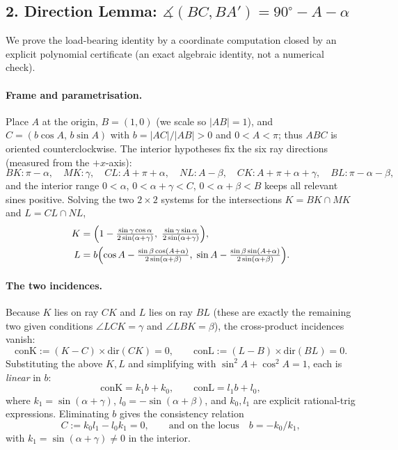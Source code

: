 \documentclass[11pt]{article}
\newcommand{\dangle}{\measuredangle}
\theoremstyle{plain}\newtheorem{lemma}{Lemma}
\theoremstyle{remark}\newtheorem*{rmk}{Remark}
\begin{document}
\subsection*{2. Direction Lemma: $\dangle(BC,BA')=90^{\circ}-A-\alpha$}

We prove the load-bearing identity by a coordinate computation closed by an
explicit polynomial certificate (an exact algebraic identity, not a numerical
check).

\paragraph{Frame and parametrisation.}
Place $A$ at the origin, $B=(1,0)$ (we scale so $|AB|=1$), and
$C=(b\cos A,\,b\sin A)$ with $b=|AC|/|AB|>0$ and $0<A<\pi$; thus $ABC$ is
oriented counterclockwise. The interior hypotheses fix the six ray directions
(measured from the $+x$-axis):
\[
  BK:\pi-\alpha,\quad MK:\gamma,\quad CL:A+\pi+\alpha,\quad
  NL:A-\beta,\quad CK:A+\pi+\alpha+\gamma,\quad BL:\pi-\alpha-\beta,
\]
and the interior range $0<\alpha$, $0<\alpha+\gamma<C$, $0<\alpha+\beta<B$ keeps
all relevant sines positive. Solving the two $2\times2$ systems for the
intersections $K=BK\cap MK$ and $L=CL\cap NL$,
\begin{align*}
  K&=\Bigl(1-\tfrac{\sin\gamma\cos\alpha}{2\sin(\alpha+\gamma)},\;
          \tfrac{\sin\gamma\sin\alpha}{2\sin(\alpha+\gamma)}\Bigr),\\
  L&=b\Bigl(\cos A-\tfrac{\sin\beta\cos(A+\alpha)}{2\sin(\alpha+\beta)},\;
          \sin A-\tfrac{\sin\beta\sin(A+\alpha)}{2\sin(\alpha+\beta)}\Bigr).
\end{align*}

\paragraph{The two incidences.}
Because $K$ lies on ray $CK$ and $L$ lies on ray $BL$ (these are exactly the
remaining two given conditions $\angle LCK=\gamma$ and $\angle LBK=\beta$), the
cross-product incidences vanish:
\[
  \mathrm{conK}:=(K-C)\times\mathrm{dir}(CK)=0,\qquad
  \mathrm{conL}:=(L-B)\times\mathrm{dir}(BL)=0.
\]
Substituting the above $K,L$ and simplifying with $\sin^2 A+\cos^2 A=1$, each is
\emph{linear} in $b$:
\[
  \mathrm{conK}=k_1 b+k_0,\qquad \mathrm{conL}=l_1 b+l_0,
\]
where $k_1=\sin(\alpha+\gamma)$, $l_0=-\sin(\alpha+\beta)$, and $k_0,l_1$ are
explicit rational-trig expressions. Eliminating $b$ gives the consistency
relation
\[
  C:=k_0 l_1-l_0 k_1=0,\qquad\text{and on the locus}\quad b=-k_0/k_1, \tag{cons}
\]
with $k_1=\sin(\alpha+\gamma)\neq0$ in the interior.
\end{document}
